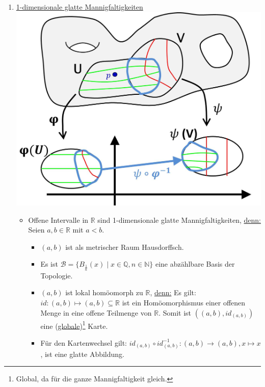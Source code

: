 \documentclass[a4paper,11pt,notitlepage]{report}
\theoremstyle{definition}
\newcommand{\R}{{\ensuremath{\mathbb{R}}}}
\newcommand{\N}{{\ensuremath{\mathbb{N}}}}
\newcommand{\Q}{{\ensuremath{\mathbb{Q}}}}
\begin{document}
\begin{enumerate}
	\item \underline{1-dimensionale glatte Mannigfaltigkeiten} \newline
	\includegraphics[scale=0.4]{images/Kartenwechsel.jpg}
		\begin{itemize}
			\item Offene Intervalle in $\R$ sind 1-dimensionale glatte Mannigfaltigkeiten, \underline{denn:} Seien $a,b \in \R$ mit $a < b$.
			\begin{itemize}
				\item $(a,b)$ ist als metrischer Raum Hausdorffsch.
				\item Es ist $\mathcal{B} = \{B_{\frac{1}{n}}(x) \mid x \in \Q, n \in \N\}$ eine abzählbare Basis der Topologie.
				\item $(a,b)$ ist lokal homöomorph zu $\R$, \underline{denn:} Es gilt: $id \colon (a,b) \mapsto (a,b) \subseteq \R$ ist ein Homöomorphismus einer offenen Menge in eine offene Teilmenge von $\R$. Somit ist $\left((a,b),id_{(a,b)}\right)$ eine (\underline{globale})\footnote{Global, da für die ganze Mannigfaltigkeit gleich.} Karte.
				\item Für den Kartenwechsel gilt: $id_{(a,b)} \circ id_{(a,b)}^{-1} \colon (a,b) \rightarrow (a,b), x \mapsto x$, ist eine glatte Abbildung.
			\end{itemize}
		

\end{itemize}
\end{enumerate}
\end{document}
